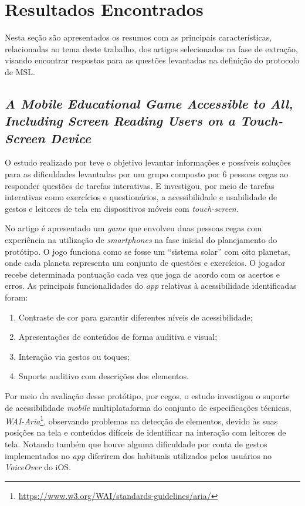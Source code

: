 \newpage{}

\section{Resultados Encontrados}

Nesta seção são apresentados os resumos com as principais características, relacionadas ao tema deste trabalho, dos artigos selecionados na fase de extração, visando encontrar respostas para as questões levantadas na definição do protocolo de MSL\@.

\subsection{\emph{A Mobile Educational Game Accessible to All, Including Screen Reading Users on a Touch-Screen Device}}

O estudo realizado por  teve o objetivo levantar informações e possíveis soluções para as dificuldades levantadas por um grupo composto por 6 pessoas cegas ao responder questões de tarefas interativas.
E investigou, por meio de tarefas interativas como exercícios e questionários, a acessibilidade e usabilidade de gestos e leitores de tela em dispositivos móveis com \emph{touch-screen}.

No artigo é apresentado um \emph{game} que envolveu duas pessoas cegas com experiência na utilização de \emph{smartphones} na fase inicial do planejamento do protótipo.
O jogo funciona como se fosse um ``sistema solar'' com oito planetas, onde cada planeta representa um conjunto de questões e exercícios.
O jogador recebe determinada pontuação cada vez que joga de acordo com os acertos e erros.
As principais funcionalidades do \emph{app} relativas à acessibilidade identificadas foram:

\begin{enumerate}
    \item Contraste de cor para garantir diferentes níveis de acessibilidade;
    \item Apresentações de conteúdos de forma auditiva e visual;
    \item Interação via gestos ou toques;
    \item Suporte auditivo com descrições dos elementos.
\end{enumerate}

Por meio da avaliação desse protótipo, por cegos, o estudo investigou o suporte de acessibilidade \emph{mobile} multiplataforma do conjunto de especificações
técnicas, \emph{WAI-Aria}\footnote{\url{https://www.w3.org/WAI/standards-guidelines/aria/}}, observando problemas na detecção de elementos, devido às suas posições
na tela e conteúdos difíceis de identificar na interação com leitores de tela.
Notando também que houve alguma dificuldade por conta de gestos implementados no \emph{app} diferirem dos habituais utilizados pelos usuários no \emph{VoiceOver} do iOS.

